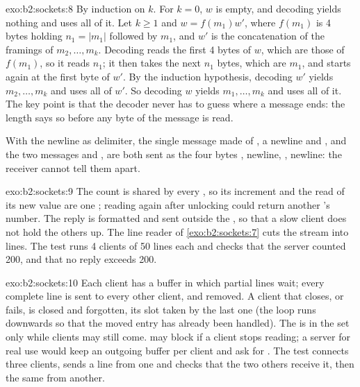\begin{solution}{exo:b2:sockets:8}
By induction on $k$. For $k = 0$, $w$ is empty, and decoding yields nothing and uses all of it. Let $k \ge 1$ and $w =
f(m_1) w'$, where $f(m_1)$ is 4 bytes holding $n_1 = |m_1|$ followed by $m_1$, and $w'$ is the concatenation of the
framings of $m_2, \dots, m_k$. Decoding reads the first 4 bytes of $w$, which are those of $f(m_1)$, so it reads
$n_1$; it then takes the next $n_1$ bytes, which are $m_1$, and starts again at the first byte of $w'$. By the
induction hypothesis, decoding $w'$ yields $m_2, \dots, m_k$ and uses all of $w'$. So decoding $w$ yields $m_1, \dots,
m_k$ and uses all of it. The key point is that the decoder never has to guess where a message ends: the length says
so before any byte of the message is read.

With the newline as delimiter, the single message made of , a newline and , and the two messages
 and , are both sent as the four bytes , newline, , newline: the receiver cannot tell
them apart.
\end{solution}

\begin{solution}{exo:b2:sockets:9}
The count is shared by every , so its increment and the read of its new value are one ; reading
 again after unlocking could return another 's number. The reply is formatted and sent outside the
, so that a slow client does not hold the others up. The line reader of \cref{exo:b2:sockets:7} cuts the stream
into lines. The test runs 4 clients of 50 lines each and checks that the server counted 200, and that no reply
exceeds 200.
\end{solution}

\begin{solution}{exo:b2:sockets:10}
Each client has a buffer in which partial lines wait; every complete line is sent to every other client, and removed.
A client that closes, or fails, is closed and forgotten, its slot taken by the last one (the loop runs downwards so
that the moved entry has already been handled). The  is in the set only while clients may still
come.  may block if a client stops reading; a server for real use would keep an outgoing buffer per
client and ask  for . The test connects three clients, sends a line from one and checks
that the two others receive it, then the same from another.
\end{solution}

